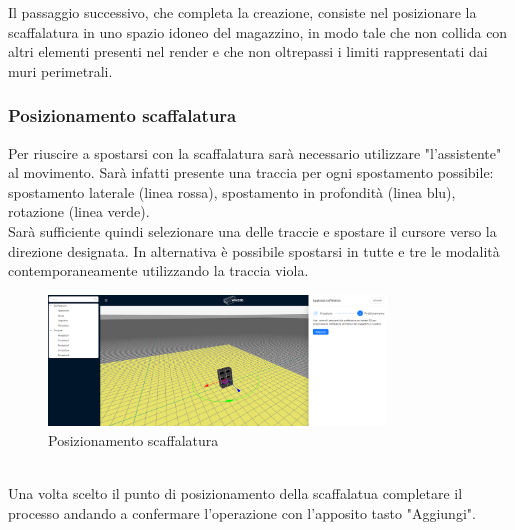             \noindent Il passaggio successivo, che completa la creazione, consiste nel posizionare la scaffalatura in uno spazio idoneo del magazzino, in modo tale 
            che non collida con altri elementi presenti nel render e che non oltrepassi i limiti rappresentati dai muri perimetrali. 
            
            \subsubsection{Posizionamento scaffalatura}\label{sec:scaffalature:posizionamento}
            Per riuscire a spostarsi con la scaffalatura sarà necessario utilizzare "l'assistente" al movimento. 
            Sarà infatti presente una traccia per ogni spostamento possibile: spostamento laterale (linea rossa), spostamento in profondità (linea blu), 
            rotazione (linea verde).\\
            Sarà sufficiente quindi selezionare una delle traccie e spostare il cursore verso la direzione designata. In alternativa è possibile spostarsi in tutte e tre 
            le modalità contemporaneamente utilizzando la traccia viola.\\
            \begin{figure}[h!]
                \centering
                \includegraphics[width=0.8\textwidth]{images/posizionamento.png}
                \caption{Posizionamento scaffalatura}
            \end{figure}
            \\
            \noindent Una volta scelto il punto di posizionamento della scaffalatua completare il processo andando a confermare l'operazione con l'apposito tasto "Aggiungi".  


